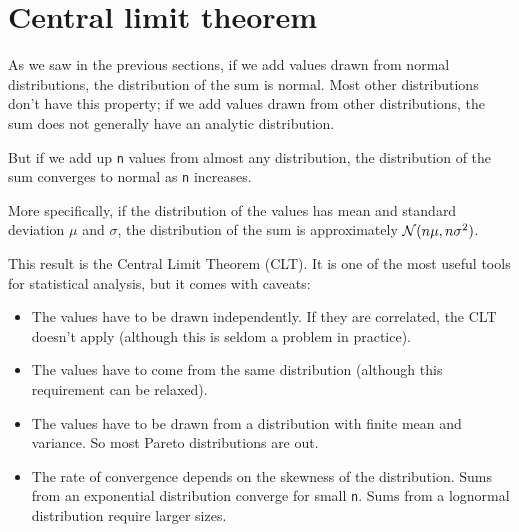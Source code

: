 \documentclass[12pt]{book}
\begin{document}
\section{Central limit theorem}
\label{CLT}

As we saw in the previous sections, if we add values drawn from normal
distributions, the distribution of the sum is normal.
Most other distributions don't have this property;
if we add values drawn from other distributions, the sum does not
generally have an analytic distribution.
 
 

But if we add up {\tt n} values from
almost any distribution, the distribution of the sum converges to
normal as {\tt n} increases.

More specifically, if the distribution of the values has mean and
standard deviation $\mu$ and $\sigma$, the distribution of the sum is
approximately $\mathcal{N}(n \mu, n \sigma^2)$.

This result is the Central Limit Theorem (CLT).  It is one of the
most useful tools for statistical analysis, but it comes with
caveats:

\begin{itemize}

\item The values have to be drawn independently.  If they are
correlated, the CLT doesn't apply (although this is seldom a problem
in practice).

\item The values have to come from the same distribution (although
  this requirement can be relaxed).

\item The values have to be drawn
  from a distribution with finite mean and variance.  So most Pareto
  distributions are out.

\item The rate of convergence depends
  on the skewness of the distribution.  Sums from an exponential
  distribution converge for small {\tt n}.  Sums from a
  lognormal distribution require larger sizes.

\end{itemize}
\end{document}
